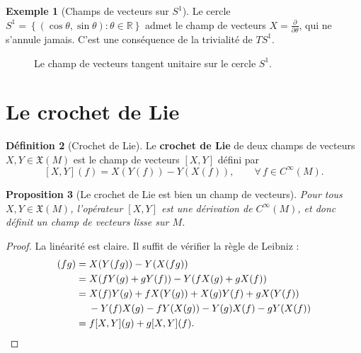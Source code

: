 \documentclass[12pt,a4paper,openany]{book}
\theoremstyle{definition}
\newtheorem{definition}{Définition}[chapter]
\newtheorem{exemple}[definition]{Exemple}
\theoremstyle{plain}
\newtheorem{proposition}[definition]{Proposition}
\theoremstyle{remark}
\newcommand{\R}{\mathbb{R}}
\newcommand{\set}[1]{\left\{#1\right\}}
\begin{document}
\begin{exemple}[Champs de vecteurs sur $S^1$]\label{ex:champ-S1}
Le cercle $S^1 = \set{(\cos\theta, \sin\theta) : \theta \in \R}$ admet le champ de
vecteurs $X = \frac{\partial}{\partial \theta}$, qui ne s'annule jamais.
C'est une conséquence de la trivialité de $TS^1$.
\end{exemple}

\begin{figure}[ht]
\centering
{}
\caption{Le champ de vecteurs tangent unitaire sur le cercle $S^1$.}\label{fig:champ-S1}
\end{figure}

\section{Le crochet de Lie}\label{sec:crochet-lie}

\begin{definition}[Crochet de Lie]\label{def:crochet-lie}
Le \textbf{crochet de Lie} de deux champs de vecteurs
$X, Y \in \mathfrak{X}(M)$ est le champ de vecteurs $[X, Y]$ défini par
\[
  [X, Y](f) = X(Y(f)) - Y(X(f)), \qquad \forall\, f \in C^\infty(M).
\]
\end{definition}

\begin{proposition}[Le crochet de Lie est bien un champ de vecteurs]\label{prop:crochet-derivation}
Pour tous $X, Y \in \mathfrak{X}(M)$, l'opérateur $[X, Y]$ est une dérivation
de $C^\infty(M)$, et donc définit un champ de vecteurs lisse sur $M$.
\end{proposition}

\begin{proof}
La linéarité est claire. Il suffit de vérifier la règle de Leibniz :
\begin{align*}
  [X,Y](fg) &= X(Y(fg)) - Y(X(fg)) \\
  &= X(fY(g) + gY(f)) - Y(fX(g) + gX(f)) \\
  &= X(f)Y(g) + fX(Y(g)) + X(g)Y(f) + gX(Y(f)) \\
  &\quad\; - Y(f)X(g) - fY(X(g)) - Y(g)X(f) - gY(X(f)) \\
  &= f[X,Y](g) + g[X,Y](f). \qedhere
\end{align*}
\end{proof}
\end{document}
